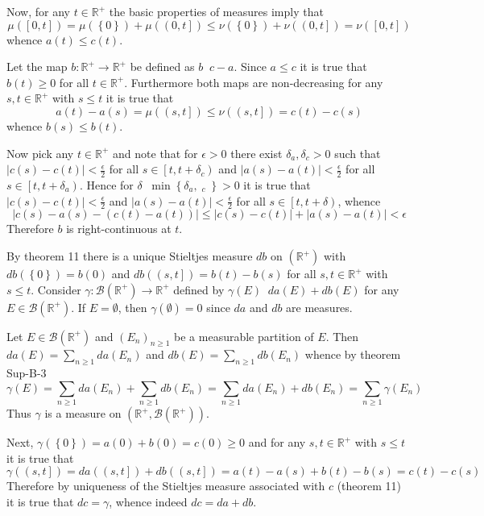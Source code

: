 \documentclass[a4paper]{article}
\newcommand{\obj}[1]{\left\{ #1 \right \}}
\newcommand{\clo}[1]{\left [ #1 \right ]}
\newcommand{\clop}[1]{\left [ #1 \right )}
\newcommand{\ploc}[1]{\left ( #1 \right ]}
\newcommand{\brac}[1]{\left ( #1 \right )}
\newcommand{\abs}[1]{\left | #1 \right |}
\newcommand{\Real}{\mathbb{R}}
\newcommand{\borel}[1]{\mathcal{B}\brac{#1}}
\newcommand{\defn}{\mathop{\overset{\Delta}{=}}\nolimits}
\begin{document}
Now, for any $t\in \Real^+$ the basic properties of measures imply that \[\mu\brac{\clo{0,t}}=\mu\brac{\obj{0}}+\mu\brac{\ploc{0,t}}\leq\nu\brac{\obj{0}}+\nu\brac{\ploc{0,t}}=\nu\brac{\clo{0,t}}\] whence $a\brac{t}\leq c\brac{t}$.

Let the map $b:\Real^+\to\Real^+$ be defined as $b\defn c-a$. Since $a\leq c$ it is true that $b\brac{t}\geq 0$ for all $t\in \Real^+$. Furthermore both maps are non-decreasing for any $s,t\in \Real^+$ with $s\leq t$ it is true that \[a\brac{t}-a\brac{s} = \mu\brac{\ploc{s,t}}\leq \nu\brac{\ploc{s,t}} = c\brac{t}-c\brac{s}\] whence $b\brac{s}\leq b\brac{t}$.

Now pick any $t\in \Real^+$ and note that for $\epsilon>0$ there exist $\delta_a,\delta_c>0$ such that $\abs{c\brac{s}-c\brac{t}}<\frac{\epsilon}{2}$ for all $s\in \clop{t,t+\delta_c}$ and $\abs{a\brac{s}-a\brac{t}}<\frac{\epsilon}{2}$ for all $s\in \clop{t,t+\delta_a}$. Hence for $\delta\defn \min\obj{\delta_a,\defn_c}>0$ it is true that $\abs{c\brac{s}-c\brac{t}}<\frac{\epsilon}{2}$ and $\abs{a\brac{s}-a\brac{t}}<\frac{\epsilon}{2}$ for all $s\in \clop{t,t+\delta}$, whence \[\abs{c\brac{s}-a\brac{s} - \brac{c\brac{t}-a\brac{t}}} \leq \abs{c\brac{s}-c\brac{t}} + \abs{a\brac{s}-a\brac{t}} < \epsilon\] Therefore $b$ is right-continuous at $t$.

By theorem 11 there is a unique Stieltjes measure $db$ on $\brac{\Real^+}$ with $db\brac{\obj{0}}=b\brac{0}$ and $db\brac{\ploc{s,t}}=b\brac{t}-b\brac{s}$ for all $s,t\in \Real^+$ with $s\leq t$. Consider $\gamma:\borel{\Real^+}\to \Real^+$ defined by $\gamma\brac{E}\defn da\brac{E}+db\brac{E}$ for any $E\in \borel{\Real^+}$. If $E=\emptyset$, then $\gamma\brac{\emptyset} = 0$ since $da$ and $db$ are measures.

Let $E\in \borel{\Real^+}$ and $\brac{E_n}_{n\geq1}$ be a measurable partition of $E$. Then $da\brac{E}=\sum_{n\geq1} da\brac{E_n}$ and $db\brac{E}=\sum_{n\geq1} db\brac{E_n}$ whence by theorem Sup-B-3 \[\gamma\brac{E} = \sum_{n\geq1} da\brac{E_n}+\sum_{n\geq1}db\brac{E_n} = \sum_{n\geq1} da\brac{E_n}+db\brac{E_n} = \sum_{n\geq1} \gamma\brac{E_n}\] Thus $\gamma$ is a measure on $\brac{\Real^+,\borel{\Real^+}}$.

Next, $\gamma\brac{\obj{0}} = a\brac{0}+b\brac{0} = c\brac{0}\geq 0$ and for any $s,t\in \Real^+$ with $s\leq t$ it is true that \[\gamma\brac{\ploc{s,t}} = da\brac{\ploc{s,t}}+db\brac{\ploc{s,t}} = a\brac{t}-a\brac{s}+b\brac{t}-b\brac{s} = c\brac{t}-c\brac{s}\] Therefore by uniqueness of the Stieltjes measure associated with $c$ (theorem 11) it is true that $dc=\gamma$, whence indeed $dc=da+db$.
\end{document}
